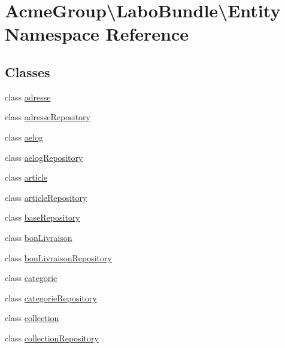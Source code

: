 \hypertarget{namespace_acme_group_1_1_labo_bundle_1_1_entity}{\section{Acme\+Group\textbackslash{}Labo\+Bundle\textbackslash{}Entity Namespace Reference}
\label{namespace_acme_group_1_1_labo_bundle_1_1_entity}
}
\subsection*{Classes}
\begin{DoxyCompactItemize}
\item 
class \hyperlink{class_acme_group_1_1_labo_bundle_1_1_entity_1_1adresse}{adresse}
\item 
class \hyperlink{class_acme_group_1_1_labo_bundle_1_1_entity_1_1adresse_repository}{adresse\+Repository}
\item 
class \hyperlink{class_acme_group_1_1_labo_bundle_1_1_entity_1_1aelog}{aelog}
\item 
class \hyperlink{class_acme_group_1_1_labo_bundle_1_1_entity_1_1aelog_repository}{aelog\+Repository}
\item 
class \hyperlink{class_acme_group_1_1_labo_bundle_1_1_entity_1_1article}{article}
\item 
class \hyperlink{class_acme_group_1_1_labo_bundle_1_1_entity_1_1article_repository}{article\+Repository}
\item 
class \hyperlink{class_acme_group_1_1_labo_bundle_1_1_entity_1_1base_repository}{base\+Repository}
\item 
class \hyperlink{class_acme_group_1_1_labo_bundle_1_1_entity_1_1bon_livraison}{bon\+Livraison}
\item 
class \hyperlink{class_acme_group_1_1_labo_bundle_1_1_entity_1_1bon_livraison_repository}{bon\+Livraison\+Repository}
\item 
class \hyperlink{class_acme_group_1_1_labo_bundle_1_1_entity_1_1categorie}{categorie}
\item 
class \hyperlink{class_acme_group_1_1_labo_bundle_1_1_entity_1_1categorie_repository}{categorie\+Repository}
\item 
class \hyperlink{class_acme_group_1_1_labo_bundle_1_1_entity_1_1collection}{collection}
\item 
class \hyperlink{class_acme_group_1_1_labo_bundle_1_1_entity_1_1collection_repository}{collection\+Repository}

\end{DoxyCompactItemize}

